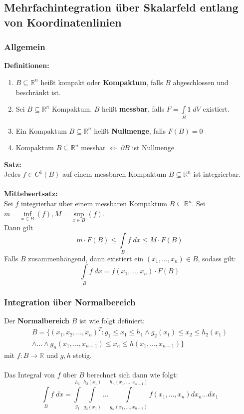 \documentclass[a4paper,twocolumn,10pt]{article}
\begin{document}
\subsection{Mehrfachintegration über Skalarfeld entlang von Koordinatenlinien}

\subsubsection{Allgemein}
\textbf{Definitionen:}
\begin{enumerate}[label=$\bullet$]
\item $B\subseteq\mathbb{R}^n$ heißt kompakt oder \textbf{Kompaktum}, falls $B$ abgeschlossen und beschränkt ist.
\item Sei $B\subseteq\mathbb{R}^n$ Kompaktum. $B$ heißt \textbf{messbar}, falls $F=\int\limits_{B}1\;dV$ existiert.
\item Ein Kompaktum $B\subseteq\mathbb{R}^n$ heißt \textbf{Nullmenge}, falls $F(B)=0$
\item Kompaktum $B\subseteq\mathbb{R}^n$ messbar $\Leftrightarrow\;\partial B$ ist Nullmenge
\end{enumerate}
\textbf{Satz:}\\
Jedes $f\in C^1(B)$ auf einem messbaren Kompaktum $B\subseteq\mathbb{R}^n$ ist integrierbar.\\\\
\textbf{Mittelwertsatz:}\\
Sei $f$ integrierbar über einem messbaren Kompaktum $B\subseteq\mathbb{R}^n$. Sei $m=\inf\limits_{x\in B}(f),M=\sup\limits_{x\in B}(f)$.\\
Dann gilt
\begin{equation*}
m\cdot F(B)\leq\int\limits_{B}f\;dx\leq M\cdot F(B)
\end{equation*}
Falls $B$ zusammenhängend, dann existiert ein $(x_1,...,x_n)\in B$, sodass gilt:
\begin{equation*}
\int\limits_{B}f\;dx=f(x_1,...,x_n)\cdot F(B)
\end{equation*}

\subsubsection{Integration über Normalbereich}
Der \textbf{Normalbereich} $B$ ist wie folgt definiert:
\begin{equation*}
\begin{split}B=\{(x_1,x_2,...,x_n)^T:g_1\leq x_1\leq h_1\land g_2(x_1)\leq x_2\leq h_2(x_1)\\ \land...\land g_n(x_1,...,x_{n-1})\leq x_n\leq h(x_1,...,x_{n-1})\}\end{split}
\end{equation*}
mit $f:B\rightarrow\mathbb{R}$ und $g,h$ stetig.\\\\
Das Integral von $f$ über $B$ berechnet sich dann wie folgt:
\begin{equation*}
\int\limits_{B}f\;dx=\int\limits_{g_1}^{h_1}\int\limits_{g_2(x_1)}^{h_2(x_1)}...\int\limits_{g_n(x_1,...,x_{n-1})}^{h_n(x_1,...,x_{n-1})}f(x_1,...,x_{n})dx_n...dx_1
\end{equation*}
\end{document}
